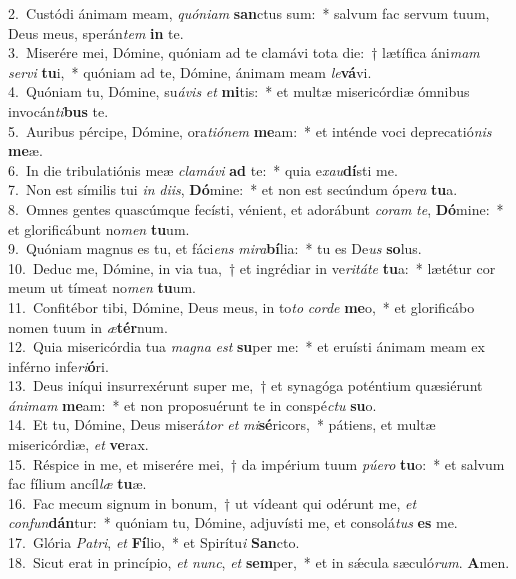 {2.~}Custódi ánimam meam, \textit{quó}\textit{ni}\textit{am} \textbf{san}ctus sum:~* salvum fac servum tuum, Deus meus, sperán\textit{tem} \textbf{in} te.\\
{3.~}Miserére mei, Dómine, quóniam ad te clamávi tota die:~† lætífica áni\textit{mam} \textit{ser}\textit{vi} \textbf{tu}i,~* quóniam ad te, Dómine, ánimam meam \textit{le}\textbf{vá}vi.\\
{4.~}Quóniam tu, Dómine, su\textit{á}\textit{vis} \textit{et} \textbf{mi}tis:~* et multæ misericórdiæ ómnibus invocán\textit{ti}\textbf{bus} te.\\
{5.~}Auribus pércipe, Dómine, ora\textit{ti}\textit{ó}\textit{nem} \textbf{me}am:~* et inténde voci deprecatió\textit{nis} \textbf{me}æ.\\
{6.~}In die tribulatiónis meæ \textit{cla}\textit{má}\textit{vi} \textbf{ad} te:~* quia e\textit{xau}\textbf{dí}sti me.\\
{7.~}Non est símilis tui \textit{in} \textit{di}\textit{is}, \textbf{Dó}mine:~* et non est secúndum ópe\textit{ra} \textbf{tu}a.\\
{8.~}Omnes gentes quascúmque fecísti, vénient, et adorábunt \textit{co}\textit{ram} \textit{te}, \textbf{Dó}mine:~* et glorificábunt no\textit{men} \textbf{tu}um.\\
{9.~}Quóniam magnus es tu, et fáci\textit{ens} \textit{mi}\textit{ra}\textbf{bí}lia:~* tu es De\textit{us} \textbf{so}lus.\\
{10.~}Deduc me, Dómine, in via tua,~† et ingrédiar in ve\textit{ri}\textit{tá}\textit{te} \textbf{tu}a:~* lætétur cor meum ut tímeat no\textit{men} \textbf{tu}um.\\
{11.~}Confitébor tibi, Dómine, Deus meus, in to\textit{to} \textit{cor}\textit{de} \textbf{me}o,~* et glorificábo nomen tuum in \textit{æ}\textbf{tér}num.\\
{12.~}Quia misericórdia tua \textit{ma}\textit{gna} \textit{est} \textbf{su}per me:~* et eruísti ánimam meam ex inférno infe\textit{ri}\textbf{ó}ri.\\
{13.~}Deus iníqui insurrexérunt super me,~† et synagóga poténtium quæsiérunt \textit{á}\textit{ni}\textit{mam} \textbf{me}am:~* et non proposuérunt te in conspé\textit{ctu} \textbf{su}o.\\
{14.~}Et tu, Dómine, Deus miserá\textit{tor} \textit{et} \textit{mi}\textbf{sé}ricors,~* pátiens, et multæ misericórdiæ, \textit{et} \textbf{ve}rax.\\
{15.~}Réspice in me, et miserére mei,~† da impérium tuum \textit{pú}\textit{e}\textit{ro} \textbf{tu}o:~* et salvum fac fílium ancíl\textit{læ} \textbf{tu}æ.\\
{16.~}Fac mecum signum in bonum,~† ut vídeant qui odérunt me, \textit{et} \textit{con}\textit{fun}\textbf{dán}tur:~* quóniam tu, Dómine, adjuvísti me, et consolá\textit{tus} \textbf{es} me.\\
{17.~}Glória \textit{Pa}\textit{tri}, \textit{et} \textbf{Fí}lio,~* et Spirítu\textit{i} \textbf{San}cto.\\
{18.~}Sicut erat in princípio, \textit{et} \textit{nunc}, \textit{et} \textbf{sem}per,~* et in sǽcula sæculó\textit{rum}. \textbf{A}men.\\
